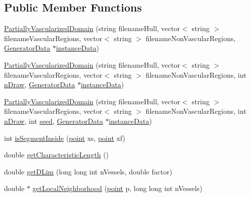\subsection*{Public Member Functions}
\begin{DoxyCompactItemize}
\item 
\hyperlink{class_partially_vascularized_domain_a98e6ef8e987c36fda10852347433ac3e}{Partially\+Vascularized\+Domain} (string filename\+Hull, vector$<$ string $>$ filename\+Vascular\+Regions, vector$<$ string $>$ filename\+Non\+Vascular\+Regions, \hyperlink{class_generator_data}{Generator\+Data} $\ast$\hyperlink{class_abstract_domain_aa37fbabc2bfa92c574f7db7544016b53}{instance\+Data})
\item 
\hyperlink{class_partially_vascularized_domain_a8da1612c7f4a4599659b9683e1f6da0f}{Partially\+Vascularized\+Domain} (string filename\+Hull, vector$<$ string $>$ filename\+Vascular\+Regions, vector$<$ string $>$ filename\+Non\+Vascular\+Regions, int \hyperlink{class_partially_vascularized_domain_ae88320ec5cef5465ad2c74ce201d5131}{n\+Draw}, \hyperlink{class_generator_data}{Generator\+Data} $\ast$\hyperlink{class_abstract_domain_aa37fbabc2bfa92c574f7db7544016b53}{instance\+Data})
\item 
\hyperlink{class_partially_vascularized_domain_a430194cae85988ff828b8d5deb46e7bc}{Partially\+Vascularized\+Domain} (string filename\+Hull, vector$<$ string $>$ filename\+Vascular\+Regions, vector$<$ string $>$ filename\+Non\+Vascular\+Regions, int \hyperlink{class_partially_vascularized_domain_ae88320ec5cef5465ad2c74ce201d5131}{n\+Draw}, int \hyperlink{class_partially_vascularized_domain_a443b5b60ce756ea5bfb05c628ed4af0d}{seed}, \hyperlink{class_generator_data}{Generator\+Data} $\ast$\hyperlink{class_abstract_domain_aa37fbabc2bfa92c574f7db7544016b53}{instance\+Data})
\item 
int \hyperlink{class_partially_vascularized_domain_a485e0e573369f76ef59477fc5ac8ea9b}{is\+Segment\+Inside} (\hyperlink{structpoint}{point} xs, \hyperlink{structpoint}{point} xf)
\item 
double \hyperlink{class_partially_vascularized_domain_a1ec0827e05801a1a3219cbd4e87ac64c}{get\+Characteristic\+Length} ()
\item 
double \hyperlink{class_partially_vascularized_domain_a7cfa7a304d236b933311f8ac5149662e}{get\+D\+Lim} (long long int n\+Vessels, double factor)
\item 
double $\ast$ \hyperlink{class_partially_vascularized_domain_a379893eff3b1612932f4689a478e73ee}{get\+Local\+Neighborhood} (\hyperlink{structpoint}{point} p, long long int n\+Vessels)

\end{DoxyCompactItemize}
